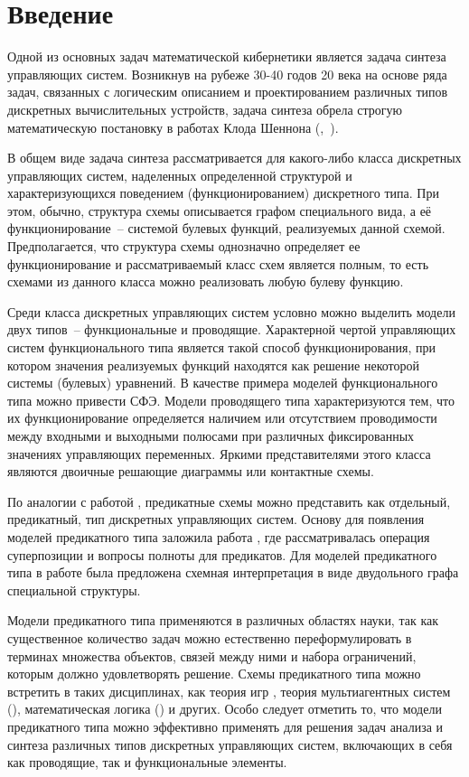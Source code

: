 \documentclass[12pt]{extarticle}
\begin{document}
\section{Введение}
\label{beginning}
Одной из основных задач математической кибернетики является задача синтеза управляющих систем.
Возникнув на рубеже 30-40 годов 20 века на основе ряда задач, связанных с логическим описанием и проектированием 
различных типов дискретных вычислительных устройств, задача синтеза обрела строгую математическую постановку в работах
Клода Шеннона (\cite{Shannon},~\cite{Shannon2}).

В общем виде задача синтеза рассматривается для какого-либо класса дискретных управляющих систем, 
наделенных определенной структурой
и характеризующихся поведением (функционированием) дискретного типа. 
При этом, обычно, структура схемы описывается графом специального
вида, а её функционирование~-- системой булевых функций, реализуемых
данной схемой. Предполагается, что структура схемы однозначно определяет ее функционирование и
рассматриваемый класс схем является полным, то есть схемами из данного класса можно реализовать любую булеву
функцию.

Среди класса дискретных управляющих систем условно можно выделить модели двух типов~-- функциональные и проводящие. 
Характерной чертой управляющих систем функционального типа является такой способ
функционирования, при котором значения реализуемых функций находятся как
решение некоторой системы (булевых) уравнений. В качестве примера моделей функционального типа
можно привести СФЭ. 
Модели проводящего типа характеризуются тем, что их 
функционирование определяется наличием или отсутствием проводимости между
входными и выходными полюсами при различных фиксированных значениях управляющих переменных. Яркими представителями 
этого класса являются двоичные решающие диаграммы или контактные схемы.

По аналогии с работой \cite{Shu11}, предикатные схемы можно представить как отдельный, предикатный, 
тип дискретных управляющих систем.
Основу для появления моделей предикатного типа заложила работа \cite{Bodnar4uk_f},
где рассматривалась операция суперпозиции и вопросы полноты для предикатов. 
Для моделей предикатного типа в работе \cite{graph_first} была предложена схемная интерпретация
в виде двудольного графа специальной структуры.

Модели предикатного типа применяются в различных областях науки, так как существенное количество задач 
можно естественно переформулировать в терминах множества объектов, связей между ними и набора ограничений, которым
должно удовлетворять решение. Схемы предикатного типа можно встретить в таких дисциплинах, как теория игр \cite{gt}, 
теория мультиагентных систем (\cite{mas}), математическая логика (\cite{ml}) и других. 
Особо следует отметить то, что модели предикатного типа можно эффективно применять для 
решения задач анализа и синтеза различных типов дискретных управляющих систем, 
включающих в себя как проводящие, так и функциональные элементы.  
\end{document}
